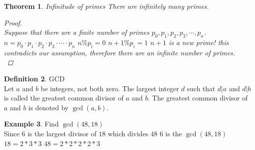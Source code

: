 \documentclass[letterpaper,10pt]{article}
\theoremstyle{plain}
\newtheorem{thm}{Theorem}[section]
\theoremstyle{definition}
\newtheorem{defn}[thm]{Definition}
\newtheorem{exmp}[thm]{Example}
\theoremstyle{remark}
\begin{document}
\begin{thm}{Infinitude of primes} 
There are infinitely many primes.
\begin{proof}
$ $\\
\vspace{1cm}
Suppose that there are a finite number of primes $p_0,p_1,p_2,p_3,\cdots,p_n$.
\newline
$n=p_0\cdot p_1\cdot p_2 \cdot p_3 \cdot\cdots\cdot p_n$
\newline
$n\% p_i=0$
\newline
$n+1\% p_i=1$
\newline
$n+1$ is a new prime! this contradicts our assumption, therefore there are an infinite number of primes.
$ $\\
\end{proof}
\end{thm}
\begin{defn}{GCD}$ $\\
Let $a$ and $b$ be integers, not both zero. The largest integer $d$ such that $d | a$ and $d | b$ is called the greatest common divisor of $a$ and $b$. The greatest common divisor of $a$ and $b$ is denoted by $\gcd(a, b)$.
\end{defn}
\begin{exmp}Find $\gcd(48, 18)$
$ $\\
Since 6 is the largest divisor of $18$ which divides $48$ 6 is the $\gcd(48,18)$
\vspace{0.5em}
\noindent
$18=2*3*3$\newline
$48=2*2*2*2*3$
\end{exmp}
\end{document}
